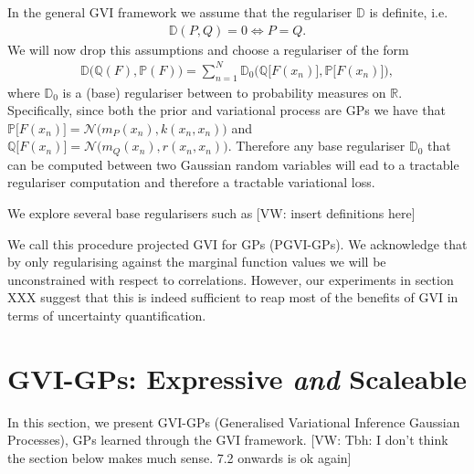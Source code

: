 \documentclass{article}
\newcommand{\vw}[1]{{\color{green} [VW: #1]}}
\newcommand{\bbP}{\mathbb{P}}
\newcommand{\bbR}{\mathbb{R}}
\newcommand{\bbD}{\mathbb{D}}
\newcommand{\bbQ}{\mathbb{Q}}
\numberwithin{equation}{section}
\begin{document}
In the general GVI framework we assume that the regulariser $\bbD$ is definite, i.e.
\begin{align}
    \bbD(P,Q) = 0 \iff P =Q.
\end{align}
We will now drop this assumptions and choose a regulariser of the form 
\begin{align}
    \bbD\big(  \bbQ(F), \bbP(F) \big) = \sum_{n=1}^N \bbD_0\Big(  \bbQ\big[F(x_n)\big], \bbP\big[F(x_n)\big] \Big),
\end{align}
where $\bbD_0$ is a (base) regulariser between to probability measures on $\bbR$. Specifically, since both the prior and variational process are GPs we have that $\bbP\big[F(x_n)\big] = \mathcal{N}\big(m_P(x_n), k(x_n,x_n)\big)$ and $\bbQ\big[F(x_n)\big] = \mathcal{N}\big(m_Q(x_n), r(x_n,x_n)\big)$. Therefore any base regulariser $\bbD_0$ that can be computed between two Gaussian random variables will ead to a tractable regulariser computation and therefore a tractable variational loss.

We explore several base regularisers such as \vw{insert definitions here}

We call this procedure projected GVI for GPs (PGVI-GPs). We acknowledge that by only regularising against the marginal function values we will be unconstrained with respect to correlations. However, our experiments in section XXX suggest that this is indeed sufficient to reap most of the benefits of GVI in terms of uncertainty quantification. 






\section{GVI-GPs: Expressive \textit{and} Scaleable}





In this section, we present GVI-GPs (Generalised Variational Inference Gaussian Processes), GPs learned through the GVI framework.
\vw{Tbh: I don't think the section below makes much sense. 7.2 onwards is ok again}
\end{document}
